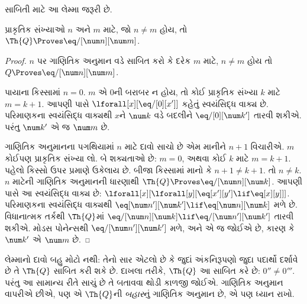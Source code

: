 \documentclass[../../../include/open-logic-section]{subfiles}
\begin{document}
સાબિતી માટે આ લેમ્મા જરૂરી છે.

\begin{lem}
પ્રાકૃતિક સંખ્યાઓ $n$ અને $m$
માટે, જો $n \neq m$ હોય, તો
$\Th{Q} \Proves \eq/[\num n][\num m]$.
\end{lem}

\begin{proof}
$n$ પર ગાણિતિક અનુમાન વડે સાબિત કરો કે
દરેક $m$ માટે, $n \neq m$ હોય
તો $Q \Proves \eq/[\num n][\num m]$.

પાયાના કિસ્સામાં $n = 0$.
$m$ એ $0$ની બરાબર ન હોય, તો
કોઈ પ્રાકૃતિક સંખ્યા $k$ માટે
$m = k + 1$. આપણી પાસે
$\lforall[x][\eq/[0][x']]$
કહેતું સ્વયંસિદ્ધ વાક્ય છે.
પરિમાણકના સ્વયંસિદ્ધ વાક્યથી
$x$ને $\num k$ વડે બદલીને
$\eq/[0][\num k']$ તારવી
શકીએ. પરંતુ $\num k'$ એ જ
$\num m$ છે.

ગાણિતિક અનુમાનના પગથિયામાં $n$ માટે
દાવો સાચો છે એમ માનીને $n+1$
વિચારીએ. $m$ કોઈપણ પ્રાકૃતિક
સંખ્યા લો. બે શક્યતાઓ છે:
$m = 0$, અથવા કોઈ $k$ માટે
$m = k+1$. પહેલો કિસ્સો ઉપર
પ્રમાણે ઉકેલાય છે. બીજા કિસ્સામાં
માનો કે $n+1 \neq k+1$.
તો $n \neq k$. $n$ માટેની
ગાણિતિક અનુમાનની ધારણાથી
$\Th{Q} \Proves \eq/[\num n][\num k]$.
આપણી પાસે આ સ્વયંસિદ્ધ વાક્ય છે:
$\lforall[x][\lforall[y][\eq[x'][y'] \lif \eq[x][y]]]$.
પરિમાણકના સ્વયંસિદ્ધ વાક્યથી
$\eq[\num n'][\num k'] \lif \eq[\num n][\num
  k]$ મળે છે. વિધાનાત્મક તર્કથી
$\Th{Q}$માં
$\eq/[\num n][\num k] \lif \eq/[\num n'][\num k']$
તારવી શકીએ. મોડસ પોનેન્સથી
$\eq/[\num n'][\num k']$ મળે,
અને એ જ જોઈએ છે, કારણ કે
$\num k'$ એ $\num m$ છે.
\end{proof}

\begin{explain}
લેમ્માનો દાવો બહુ મોટો નથી:
તેનો સાર એટલો છે કે જુદાં
અંકનિરૂપણો જુદા પદાર્થો દર્શાવે
છે તે $\Th{Q}$ સાબિત કરી શકે છે.
દાખલા તરીકે, $\Th{Q}$ આ સાબિત
કરે છે: $0'' \neq 0'''$.
પરંતુ આ સામાન્ય રીતે સાચું છે
તે બતાવવા થોડી કાળજી જોઈએ.
ગાણિતિક અનુમાન વાપરીએ છીએ, પણ એ
$\Th{Q}$ની \emph{બહાર}નું
ગાણિતિક અનુમાન છે, એ પણ ધ્યાન રાખો.
\end{explain}
\end{document}
